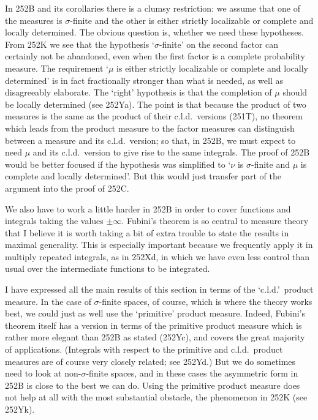 {In 252B and its corollaries there is a clumsy restriction:  we assume
that one of the measures is $\sigma$-finite and the other is either
strictly localizable or complete and locally determined.   The obvious
question is, whether we need these hypotheses.   From 252K we see that
the hypothesis `$\sigma$-finite' on the second factor can certainly not
be abandoned, even when the first factor is a complete probability
measure.   The requirement `$\mu$ is either strictly localizable or
complete and locally determined' is in fact fractionally stronger than
what is needed, as well as disagreeably elaborate.   The `right'
hypothesis is that the completion of $\mu$ should be locally determined
(see 252Ya).   The point is that because the
product of two measures is the same as the product of their c.l.d.\
versions (251T), no theorem which leads from the product measure to the
factor measures can distinguish between a measure and its c.l.d.\
version;  so that, in 252B, we must expect to need $\mu$ and its c.l.d.\
version to give rise to the same integrals.   The proof of 252B would be
better focused if the hypothesis was simplified to `$\nu$ is
$\sigma$-finite and $\mu$ is complete and locally determined'.   But
this would just transfer part of the argument into the proof of 252C.

We also have to work a little harder in 252B in order to cover functions
and integrals taking the values $\pm\infty$.   Fubini's theorem is so
central to measure theory that I believe it is worth taking a bit of
extra trouble to state the results in maximal generality.   This is
especially important because we frequently apply it in multiply repeated
integrals, as in 252Xd, in which we have even less control than usual
over the intermediate functions to be integrated.

I have expressed all the main results of this section in terms of the
`c.l.d.'\ product measure.   In the case of $\sigma$-finite spaces, of
course, which is where the theory works best, we could just as well use
the `primitive' product measure.   Indeed, Fubini's theorem itself has a
version in terms of the primitive product measure which is rather more
elegant than 252B as stated (252Yc), and covers the great majority of
applications.   (Integrals with respect to the primitive and c.l.d.\
product measures are of course very closely related;  see 252Yd.)   But
we do sometimes need to look at
non-$\sigma$-finite spaces, and in these cases the asymmetric form in
252B is close to the best we can do.   Using the primitive product
measure does not help at all with the most substantial obstacle, the
phenomenon in 252K (see 252Yk).

}
